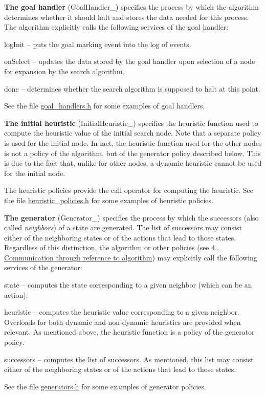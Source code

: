 \begin{DoxyItemize}
\item {\bfseries The goal handler} ({\ttfamily Goal\+Handler\+\_\+}) specifies the process by which the algorithm determines whether it should halt and stores the data needed for this process. The algorithm explicitly calls the following services of the goal handler\+:
\begin{DoxyItemize}
\item {\ttfamily log\+Init} -- puts the goal marking event into the log of events.
\item {\ttfamily on\+Select} -- updates the data stored by the goal handler upon selection of a node for expansion by the search algorithm.
\item {\ttfamily done} -- determines whether the search algorithm is supposed to halt at this point.
\end{DoxyItemize}

See the file \hyperlink{goal__handlers_8h}{goal\+\_\+handlers.\+h} for some examples of goal handlers.
\item {\bfseries The initial heuristic} ({\ttfamily Initial\+Heuristic\+\_\+}) specifies the heuristic function used to compute the heuristic value of the initial search node. Note that a separate policy is used for the initial node. In fact, the heuristic function used for the other nodes is not a policy of the algorithm, but of the generator policy described below. This is due to the fact that, unlike for other nodes, a dynamic heuristic cannot be used for the initial node.

The heuristic policies provide the call operator for computing the heuristic. See the file \hyperlink{heuristic__policies_8h}{heuristic\+\_\+policies.\+h} for some examples of heuristic policies.
\item {\bfseries The generator} ({\ttfamily Generator\+\_\+}) specifies the process by which the successors (also called {\itshape neighbors}) of a state are generated. The list of successors may consist either of the neighboring states or of the actions that lead to those states. Regardless of this distinction, the algorithm or other policies (see \hyperlink{index_s-communication}{4.. Communication through reference to algorithm}) may explicitly call the following services of the generator\+:
\begin{DoxyItemize}
\item {\ttfamily state} -- computes the state corresponding to a given neighbor (which can be an action).
\item {\ttfamily heuristic} -- computes the heuristic value corresponding to a given neighbor. Overloads for both dynamic and non-\/dynamic heuristics are provided when relevant. As mentioned above, the heuristic function is a policy of the generator policy.
\item {\ttfamily successors} -- computes the list of successors. As mentioned, this list may consist either of the neighboring states or of the actions that lead to those states.
\end{DoxyItemize}

See the file \hyperlink{generators_8h}{generators.\+h} for some examples of generator policies.
\end{DoxyItemize}

